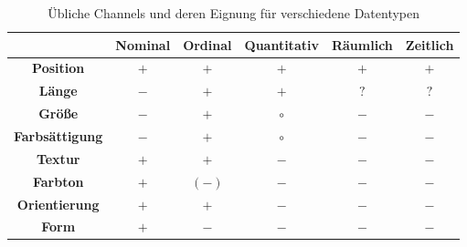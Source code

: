 			\begin{table}
				\centering
				\begin{tabular}{c|ccccc}
					\toprule
					                       & \textbf{Nominal} & \textbf{Ordinal} & \textbf{Quantitativ} & \textbf{Räumlich} & \textbf{Zeitlich} \\ \midrule
					\textbf{Position}      & \(+\)            & \(+\)            & \(+\)                & \(+\)             & \(+\)             \\
					\textbf{Länge}         & \(-\)            & \(+\)            & \(+\)                & \(?\)             & \(?\)             \\
					\textbf{Größe}         & \(-\)            & \(+\)            & \(\circ\)            & \(-\)             & \(-\)             \\
					\textbf{Farbsättigung} & \(-\)            & \(+\)            & \(\circ\)            & \(-\)             & \(-\)             \\
					\textbf{Textur}        & \(+\)            & \(+\)            & \(-\)                & \(-\)             & \(-\)             \\
					\textbf{Farbton}       & \(+\)            & \((-)\)          & \(-\)                & \(-\)             & \(-\)             \\
					\textbf{Orientierung}  & \(+\)            & \(+\)            & \(-\)                & \(-\)             & \(-\)             \\
					\textbf{Form}          & \(+\)            & \(-\)            & \(-\)                & \(-\)             & \(-\)             \\ \bottomrule
				\end{tabular}
				\caption{Übliche Channels und deren Eignung für verschiedene Datentypen}
				\label{tab:channelsDatentypen}
			\end{table}
